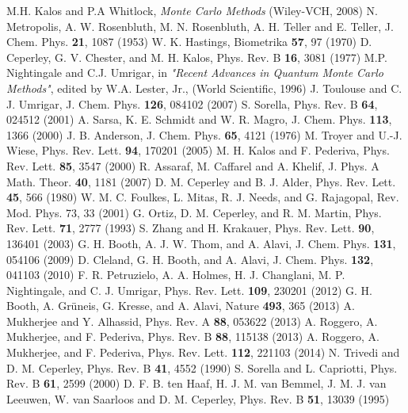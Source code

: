 \begin{thebibliography}{99.}%
M.H. Kalos and P.A Whitlock, {\em Monte Carlo Methods} (Wiley-VCH, 2008)
N. Metropolis, A. W. Rosenbluth, M. N. Rosenbluth, A. H. Teller and E. Teller,  J. Chem. Phys. {\bf 21}, 1087 (1953)
W. K. Hastings,  Biometrika {\bf 57}, 97 (1970)
D. Ceperley, G. V. Chester, and M. H. Kalos, Phys. Rev. B {\bf 16}, 3081 (1977)
M.P. Nightingale and C.J. Umrigar, in \emph{"Recent Advances in Quantum Monte Carlo Methods"}, edited by W.A. Lester, Jr., (World Scientific, 1996)
J. Toulouse and C. J. Umrigar,  J. Chem. Phys. {\bf 126}, 084102 (2007)
S. Sorella,  Phys. Rev. B {\bf 64}, 024512 (2001)
A. Sarsa, K. E. Schmidt and W. R. Magro, J. Chem. Phys. {\bf 113}, 1366 (2000)
J. B. Anderson,  J. Chem. Phys. {\bf 65}, 4121 (1976)
M. Troyer and U.-J. Wiese,  Phys. Rev. Lett. {\bf 94}, 170201 (2005)
M. H. Kalos and F. Pederiva, Phys. Rev. Lett. {\bf 85}, 3547 (2000)
R. Assaraf, M. Caffarel and A. Khelif,  J. Phys. A Math. Theor. {\bf 40}, 1181 (2007)
D. M. Ceperley and B. J. Alder, Phys. Rev. Lett. {\bf 45}, 566 (1980)
W. M. C. Foulkes, L. Mitas, R. J. Needs, and G. Rajagopal, Rev. Mod. Phys. 73, 33 (2001)
G. Ortiz, D. M. Ceperley, and R. M. Martin, Phys. Rev. Lett. {\bf 71}, 2777 (1993)
S. Zhang and H. Krakauer,  Phys. Rev. Lett. {\bf 90}, 136401 (2003)
G. H. Booth, A. J. W. Thom, and A. Alavi,  J. Chem. Phys. {\bf 131}, 054106 (2009)
D. Cleland, G. H. Booth, and A. Alavi, J. Chem. Phys. {\bf 132}, 041103 (2010)
 F. R. Petruzielo, A. A. Holmes, H. J. Changlani, M. P.
Nightingale, and C. J. Umrigar, Phys. Rev. Lett. {\bf 109}, 230201 (2012)
G. H. Booth, A. Gr\"uneis, G. Kresse, and A. Alavi, Nature
{\bf 493}, 365 (2013)
A. Mukherjee and Y. Alhassid,  Phys. Rev. A {\bf 88}, 053622 (2013)
A. Roggero, A. Mukherjee, and F. Pederiva, Phys. Rev. B {\bf 88}, 115138 (2013)
A. Roggero, A. Mukherjee, and F. Pederiva, Phys. Rev. Lett. {\bf 112}, 221103 (2014)
N. Trivedi and D. M. Ceperley, Phys. Rev. B {\bf 41}, 4552 (1990)
S. Sorella and L. Capriotti,  Phys. Rev. B {\bf 61}, 2599 (2000)
D. F. B. ten Haaf, H. J. M. van Bemmel, J. M. J. van Leeuwen, W. van Saarloos and D. M. Ceperley,  Phys. Rev. B {\bf 51}, 13039 (1995)

\end{thebibliography}
